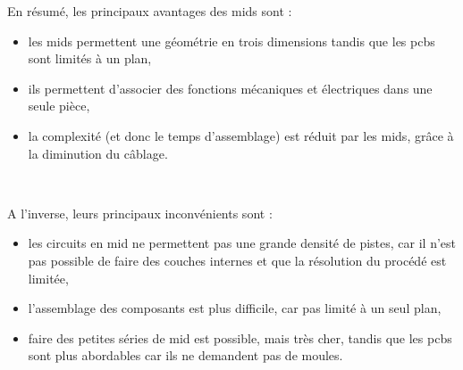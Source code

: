 En résumé, les principaux avantages des \glspl{mid} sont :
\begin{itemize}
    \item les \glspl{mid} permettent une géométrie en trois dimensions tandis que les \glspl{pcb} sont limités à un plan,
    \item ils permettent d'associer des fonctions mécaniques et électriques dans une seule pièce,
    \item la complexité (et donc le temps d'assemblage) est réduit par les \glspl{mid}, grâce à la diminution du câblage.
\end{itemize}

~

A l'inverse, leurs principaux inconvénients sont :
\begin{itemize}
    \item les circuits en \gls{mid} ne permettent pas une grande densité de pistes, car il n'est pas possible de faire des couches internes et que la résolution du procédé est limitée,
    \item l'assemblage des composants est plus difficile, car pas limité à un seul plan,
    \item faire des petites séries de \gls{mid} est possible, mais très cher, tandis que les \glspl{pcb} sont plus abordables car ils ne demandent pas de moules.
\end{itemize}
